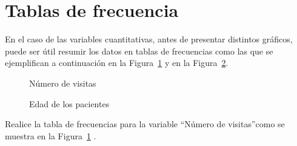 \documentclass{../prob}
\begin{document}
\section*{Tablas de frecuencia}    
    \begin{problema}
    En el caso de las variables cuantitativas, antes de presentar distintos gráficos, puede ser útil resumir los datos en tablas de frecuencias como las que se ejemplifican a continuación en la Figura~\ref{fig:tabla2} y en la Figura~\ref{fig:tabla3}.
    
    \begin{figure}[!ht]
    \centering
    
    \caption{Número de visitas}
    \label{fig:tabla2}
	\end{figure}

    \begin{figure}[!ht]
    \centering
    
    \caption{Edad de los pacientes}
    \label{fig:tabla3}
	\end{figure}
	
	\begin{parte}
		Realice la tabla de frecuencias para la variable \textquotedblleft Número de visitas\textquotedblright como se muestra en la Figura~\ref{fig:tabla2} . \\
	
\noindent{}	
	\end{parte}
	

\end{problema}
\end{document}
